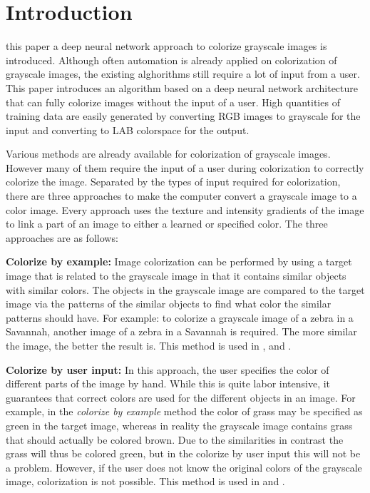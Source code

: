 \section{Introduction}\label{sec:into}

%
%
%

 this paper a deep neural network approach to colorize grayscale images is introduced. Although often automation is already applied on colorization of grayscale images, the existing alghorithms still require a lot of input from a user. This paper introduces an algorithm based on a deep neural network architecture that can fully colorize images without the input of a user. High quantities of training data are easily generated by converting RGB images to grayscale for the input and converting to LAB colorspace for the output. 

Various methods are already available for colorization of grayscale images. However many of them require the input of a user during colorization to correctly colorize the image. Separated by the types of input required for colorization, there are three approaches to make the computer convert a grayscale image to a color image. Every approach uses the texture and intensity gradients of the image to link a part of an image to either a learned or specified color. The three approaches are as follows:

\textbf{Colorize by example:} Image colorization can be performed by using a target image that is related to the grayscale image in that it contains similar objects with similar colors. The objects in the grayscale image are compared to the target image via the patterns of the similar objects to find what color the similar patterns should have. For example: to colorize a grayscale image of a zebra in a Savannah, another image of a zebra in a Savannah is required. The more similar the image, the better the result is. This method is used in \cite{Charpiat}, \cite{Gupta} and \cite{Zheng}.

\textbf{Colorize by user input:} In this approach, the user specifies the color of different parts of the image by hand. While this is quite labor intensive, it guarantees that correct colors are used for the different objects in an image. For example, in the \textit{colorize by example} method the color of grass may be specified as green in the target image, whereas in reality the grayscale image contains grass that should actually be colored brown. Due to the similarities in contrast the grass will thus be colored green, but in the colorize by user input this will not be a problem. However, if the user does not know the original colors of the grayscale image, colorization is not possible. This method is used in \cite{Horiuchi} and \cite{Levin}.


